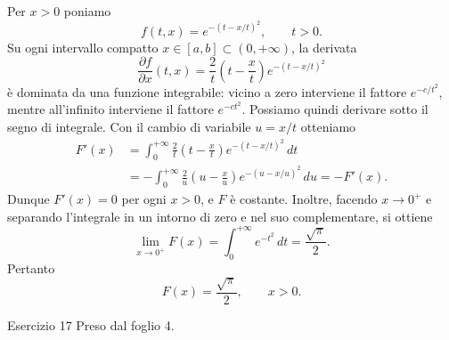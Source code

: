 \documentclass[a4paper]{article}
\begin{document}
\begin{snippetsolution}{}
    Per \(x>0\) poniamo
    \[
        f(t,x)=e^{-(t-x/t)^2},\qquad t>0.
    \]
    Su ogni intervallo compatto \(x\in[a,b]\subset(0,+\infty)\), la derivata
    \[
        \frac{\partial f}{\partial x}(t,x)
        =\frac{2}{t}\left(t-\frac{x}{t}\right)e^{-(t-x/t)^2}
    \]
    è dominata da una funzione integrabile: vicino a zero interviene il fattore
    \(e^{-c/t^2}\), mentre all'infinito interviene il fattore \(e^{-ct^2}\).
    Possiamo quindi derivare sotto il segno di integrale. Con il cambio di variabile
    \(u=x/t\) otteniamo
    \begin{align*}
        F'(x)
        &=\int_0^{+\infty}
        \frac{2}{t}\left(t-\frac{x}{t}\right)e^{-(t-x/t)^2}\,dt\\
        &=-\int_0^{+\infty}
        \frac{2}{u}\left(u-\frac{x}{u}\right)e^{-(u-x/u)^2}\,du
        =-F'(x).
    \end{align*}
    Dunque \(F'(x)=0\) per ogni \(x>0\), e \(F\) è costante. Inoltre, facendo
    \(x\to0^+\) e separando l'integrale in un intorno di zero e nel suo complementare,
    si ottiene
    \[
        \lim_{x\to0^+}F(x)=\int_0^{+\infty}e^{-t^2}\,dt=\frac{\sqrt\pi}{2}.
    \]
    Pertanto
    \[
        F(x)=\frac{\sqrt\pi}{2},\qquad x>0.
    \]
\end{snippetsolution}

\begin{snippetexercise}{Esercizio 17}
    Preso dal foglio 4.
\end{snippetexercise}
\end{document}

